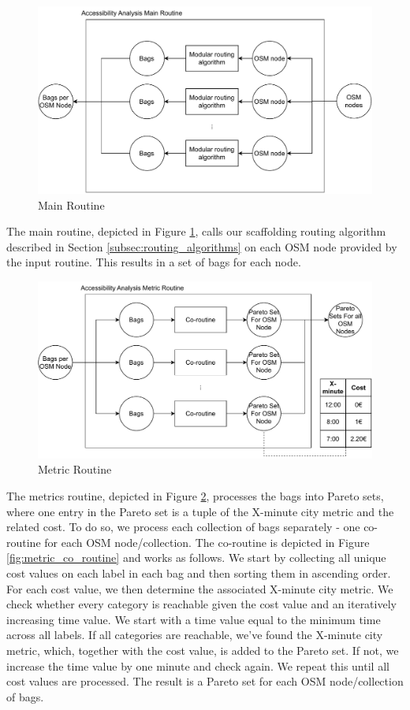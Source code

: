 \begin{figure}
    \centering
    \includegraphics[scale=0.50]{Figures/method/main_routine}
    \caption{Main Routine}
    \label{fig:main_routine}
\end{figure}
The main routine, depicted in Figure \ref{fig:main_routine}, calls our scaffolding routing algorithm described in Section \ref{subsec:routing_algorithms} on each OSM node provided by the input routine.
This results in a set of bags for each node.

\begin{figure}
    \centering
    \includegraphics[scale=0.50]{Figures/method/metric_routine}
    \caption{Metric Routine}
    \label{fig:metric_routine}
\end{figure}
The metrics routine, depicted in Figure \ref{fig:metric_routine}, processes the bags into Pareto sets, where one entry in the Pareto set is a tuple of the X-minute city metric and the related cost.
To do so, we process each collection of bags separately - one co-routine for each OSM node/collection.
The co-routine is depicted in Figure \ref{fig:metric_co_routine} and works as follows.
We start by collecting all unique cost values on each label in each bag and then sorting them in ascending order.
For each cost value, we then determine the associated X-minute city metric.
We check whether every category is reachable given the cost value and an iteratively increasing time value.
We start with a time value equal to the minimum time across all labels.
If all categories are reachable, we've found the X-minute city metric, which, together with the cost value, is added to the Pareto set.
If not, we increase the time value by one minute and check again.
We repeat this until all cost values are processed.
The result is a Pareto set for each OSM node/collection of bags.

